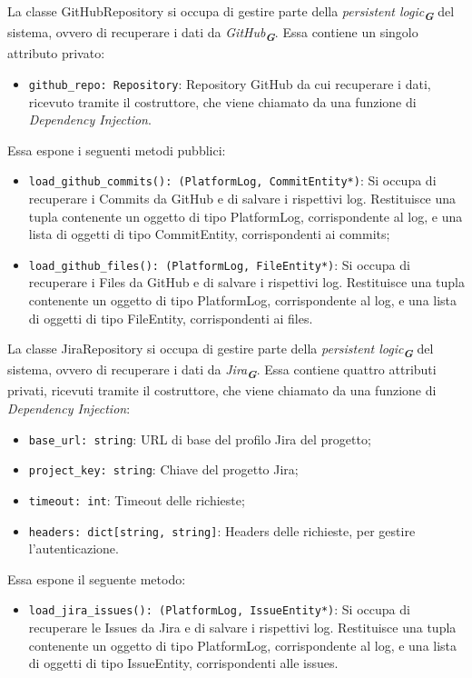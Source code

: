\label{sec:github_repository}
La classe GitHubRepository si occupa di gestire parte della \emph{persistent logic}\textsubscript{\textbf{\textit{G}}} del sistema, ovvero di recuperare i dati da \emph{GitHub}\textsubscript{\textbf{\textit{G}}}. Essa contiene un singolo attributo privato:
\begin{itemize}
    \item \texttt{github\_repo: Repository}: Repository GitHub da cui recuperare i dati, ricevuto tramite il costruttore, che viene chiamato da una funzione di \emph{Dependency Injection}.
\end{itemize}
Essa espone i seguenti metodi pubblici:
\begin{itemize}
    \item \texttt{load\_github\_commits(): (PlatformLog, CommitEntity*)}: Si occupa di recuperare i Commits da GitHub e di salvare i rispettivi log. Restituisce una tupla contenente un oggetto di tipo PlatformLog, corrispondente al log, e una lista di oggetti di tipo CommitEntity, corrispondenti ai commits;
    \item \texttt{load\_github\_files(): (PlatformLog, FileEntity*)}: Si occupa di recuperare i Files da GitHub e di salvare i rispettivi log. Restituisce una tupla contenente un oggetto di tipo PlatformLog, corrispondente al log, e una lista di oggetti di tipo FileEntity, corrispondenti ai files.
\end{itemize}

\label{sec:jira_repository}
La classe JiraRepository si occupa di gestire parte della \emph{persistent logic}\textsubscript{\textbf{\textit{G}}} del sistema, ovvero di recuperare i dati da \emph{Jira}\textsubscript{\textbf{\textit{G}}}. Essa contiene quattro attributi privati, ricevuti tramite il costruttore, che viene chiamato da una funzione di \emph{Dependency Injection}:
\begin{itemize}
    \item \texttt{base\_url: string}: URL di base del profilo Jira del progetto;
    \item \texttt{project\_key: string}: Chiave del progetto Jira;
    \item \texttt{timeout: int}: Timeout delle richieste;
    \item \texttt{headers: dict[string, string]}: Headers delle richieste, per gestire l'autenticazione.
\end{itemize}
Essa espone il seguente metodo:
\begin{itemize}
    \item \texttt{load\_jira\_issues(): (PlatformLog, IssueEntity*)}: Si occupa di recuperare le Issues da Jira e di salvare i rispettivi log. Restituisce una tupla contenente un oggetto di tipo PlatformLog, corrispondente al log, e una lista di oggetti di tipo IssueEntity, corrispondenti alle issues.
\end{itemize}

